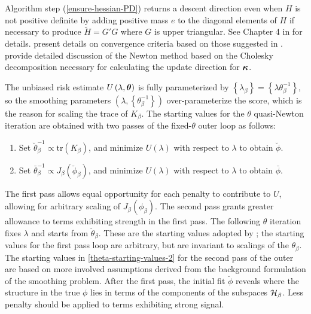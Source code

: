 Algorithm step (\ref{ensure-hessian-PD}) returns a descent direction even when $H$ is not positive definite by adding positive mass $e$ to the diagonal elements of $H$ if necessary to produce $\tilde{H} = G'G$ where $G$ is upper triangular. See Chapter 4 in \cite{gill1981practical} for details. \cite{gu1991minimizing} present details on convergence criteria based on those suggested in \cite{gill1981practical}. \cite{gill1981practical} provide detailed discussion of the Newton method based on the Cholesky decomposition necessary for calculating the update direction for $\mbox{\boldmath $\kappa$}$. 

\bigskip

The unbiased risk estimate $U\left(\lambda, \mbox{\boldmath $\theta$}\right)$ is fully parameterized by $\left\{\lambda_\beta \right\} = \left\{\lambda \theta^{-1}_\beta \right\}$, so the smoothing parameters $\left(\lambda, \left\{\theta^{-1}_\beta \right\}\right)$ over-parameterize the score, which is the reason for scaling the trace of $K_\beta$. The starting values for the $\theta$ quasi-Newton iteration are obtained with two passes of the fixed-$\theta$ outer loop as follows:
\begin{enumerate}
\item Set $\breve{\theta}_\beta^{-1} \propto \mbox{tr}\left( K_\beta \right)$, and minimize $U\left(\lambda\right)$ with respect to $\lambda$ to obtain $\breve{\phi}$. \label{theta-starting-values-1}
\item Set $\bar{\theta}_\beta^{-1} \propto  J_\beta\left(\breve{\phi}_\beta \right)$, and minimize $U\left(\lambda\right)$ with respect to $\lambda$ to obtain $\bar{\phi}$. \label{theta-starting-values-2}
\end{enumerate}
\noindent
The first pass allows equal opportunity for each penalty to contribute to $U$, allowing for arbitrary scaling of $J_\beta \left(\phi_\beta\right)$. The second pass grants greater allowance to terms exhibiting strength in the first pass. The following $\theta$ iteration fixes $\lambda$ and starts from $\check{\theta}_\beta$. These are the starting values adopted by \cite{gu1991minimizing}; the starting values for the first pass loop are arbitrary, but are invariant to scalings of the $\theta_\beta$. The starting values in \ref{theta-starting-values-2} for the second pass of the outer are based on more involved assumptions derived from the background formulation of the smoothing problem. After the first pass, the initial fit $\breve{\phi}$ reveals where the structure in the true $\phi$ lies in terms of the components of the subspaces $\mathcal{H}_\beta$. Less penalty should be applied to terms exhibiting strong signal.   %



